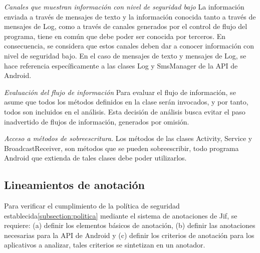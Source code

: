 \textit{Canales que muestran información con nivel de seguridad bajo}\newline
La información enviada a través de mensajes de texto y la información conocida
tanto a través de mensajes de Log, como a través de canales generados por el
control de flujo del programa, tiene en común que debe poder ser conocida por
terceros. En consecuencia, se considera que estos canales deben dar a conocer
información con nivel de seguridad bajo.\newline
En el caso de mensajes de texto y mensajes de Log, se hace referencia
específicamente a las clases Log y SmsManager de la API de Android.

\textit{Evaluación del flujo de información}\newline
Para evaluar el flujo de información, se asume que todos los métodos definidos
en la clase serán invocados, y por tanto, todos son incluidos en el análisis.\newline 
Esta decisión de análisis busca evitar el paso inadvertido de flujos de
información, generados por omisión.

\textit{Acceso a métodos de sobreescritura.}\newline
Los métodos de las clases Activity, Service y BroadcastReceiver, son métodos
que se pueden sobreescribir, todo programa Android que extienda de tales clases
debe poder utilizarlos.

\subsection{Lineamientos de anotación}
\label{subsec:linemientos}
Para verificar el cumplimiento de la política de seguridad
establecida\ref{subsection:politica} mediante el sistema de anotaciones de Jif,
se requiere: (a) definir los elementos básicos de anotación, (b) definir
las anotaciones necesarias para la API de Android y (c) definir los
criterios de anotación para los aplicativos a analizar, tales 
criterios se sintetizan en un anotador.

